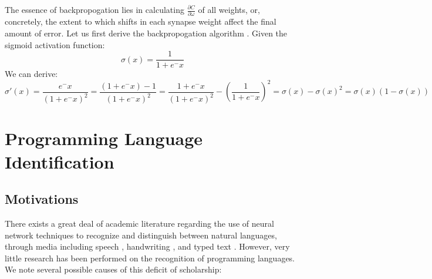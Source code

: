 \documentclass{article}
\begin{document}
The essence of backpropogation lies in calculating $\frac{\partial{C}}{\partial{\omega}}$ of all weights, or, concretely, the extent to which shifts in each synapse weight affect the final amount of error. Let us first derive the backpropogation algorithm \cite{derivebackprop}. Given the sigmoid activation function:
$$\sigma(x)=\frac{1}{1+e^-x}$$
We can derive:
$$\sigma'(x)=\frac{e^-x}{(1+e^-x)^2}=\frac{(1+e^-x)-1}{(1+e^-x)^2}=\frac{1+e^-x}{(1+e^-x)^2}-\left(\frac{1}{1+e^-x}\right)^2=\sigma(x)-\sigma(x)^2=\sigma(x)(1-\sigma(x))$$

\section{Programming Language Identification}
\subsection{Motivations}
There exists a great deal of academic literature regarding the use of neural network techniques to recognize and distinguish between natural languages, through media including speech \cite{rnnspoken}\cite{dcrnnspoken}, handwriting \cite{handwritingex}, and typed text \cite{langidnn}\cite{langidstanford}. However, very little research has been performed on the recognition of programming languages. We note several possible causes of this deficit of scholarship:
\end{document}
